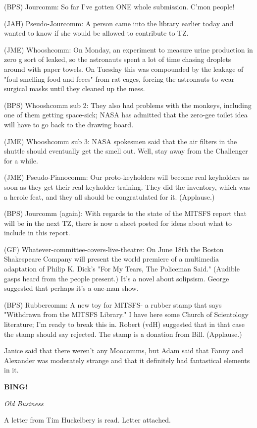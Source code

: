 \documentclass[12pt]{article}
\newcommand{\bing}{{\bf BING!} }
\newcommand{\goto}[1]{\bing \vskip 12pt \centerline{{\em{#1}}}}
\begin{document}
(BPS) Jourcomm: So far I've gotten ONE whole submission. C'mon people!

(JAH) Pseudo-Jourcomm: A person came into the library earlier today and wanted to know if she would be allowed to contribute to TZ.

(JME) Whooshcomm: On Monday, an experiment to measure urine production in zero g sort of leaked, so the astronauts spent a lot of time chasing droplets around with paper towels. On Tuesday this was compounded by the leakage of "foul smelling food and feces" from rat cages, forcing the astronauts to wear surgical masks until they cleaned up the mess.

(BPS) Whooshcomm sub 2: They also had problems with the monkeys, including one of them getting space-sick; NASA has admitted that the zero-gee toilet idea will have to go back to the drawing board.

(JME) Whooshcomm sub 3: NASA spokesmen said that the air filters in the shuttle should eventually get the smell out. Well, stay away from the Challenger for a while.

(JME) Pseudo-Pianocomm: Our proto-keyholders will become real keyholders as soon as they get their real-keyholder training. They did the inventory, which was a heroic feat, and they all should be congratulated for it. (Applause.)

(BPS) Jourcomm (again): With regards to the state of the MITSFS report that will be in the next TZ, there is now a sheet posted for ideas about what to include in this report.

(GF) Whatever-committee-covers-live-theatre: On June 18th the Boston Shakespeare Company will present the world premiere of a multimedia adaptation of Philip K. Dick's "For My Tears, The Policeman Said." (Audible gasps heard from the people present.) It's a novel about solipsism. George suggested that perhaps it's a one-man show.

(BPS) Rubbercomm: A new toy for MITSFS- a rubber stamp that says "Withdrawn from the MITSFS Library." I have here some Church of Scientology literature; I'm ready to break this in. Robert (vdH) suggested that in that case the stamp should say rejected. The stamp is a donation from Bill. (Applause.)

Janice said that there weren't any Moocomms, but Adam said that Fanny and Alexander was moderately strange and that it definitely had fantastical elements in it.

\goto{Old Business}

A letter from Tim Huckelbery is read. Letter attached.
\end{document}
